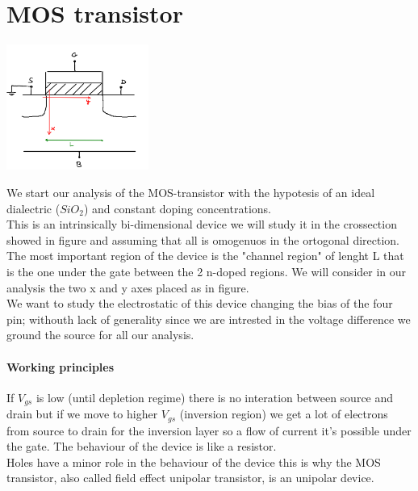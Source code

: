 \chapter{MOS transistor}
\centering
\includegraphics[width=0.35\textwidth]{mos1.png}\\
\raggedright

We start our analysis of the MOS-transistor with the hypotesis of an ideal dialectric ($SiO_2$) and constant doping concentrations.\\
This is an intrinsically bi-dimensional device we will study it in the crossection showed in figure and assuming that all is omogenuos in the ortogonal direction.\\
The most important region of the device is the "channel region" of lenght L that is the one under the gate between the 2 n-doped regions. We will consider in our analysis the two x and y axes placed as in figure.\\
We want to study the electrostatic of this device changing the bias of the four pin; withouth lack of generality since we are intrested in the voltage difference we ground the source for all our analysis.\\


\subsubsection{Working principles}
If $V_{gs}$ is low (until depletion regime) there is no interation between source and drain but if we move to higher $V_{gs}$ (inversion region) we get a lot of electrons from source to drain for the inversion layer so a flow of current it's possible under the gate. The behaviour of the device is like a resistor.\\
Holes have a minor role in the behaviour of the device this is why the MOS transistor, also called field effect unipolar transistor, is an unipolar device.\\

